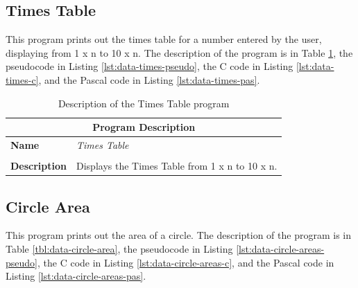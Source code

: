 \subsection{Times Table} %
\label{sub:times_table}

This program prints out the times table for a number entered by the user, displaying from 1 x n to 10 x n. The description of the program is in Table \ref{tbl:data-times-table}, the pseudocode in Listing \ref{lst:data-times-pseudo}, the C code in Listing \ref{lst:data-times-c}, and the Pascal code in Listing \ref{lst:data-times-pas}.

\begin{table}[h]
\centering
\begin{tabular}{l|p{10cm}}
  \hline
  \multicolumn{2}{c}{\textbf{Program Description}} \\
  \hline
  \textbf{Name} & \emph{Times Table} \\
  \\
  \textbf{Description} & Displays the Times Table from 1 x n to 10 x n. \\
  \hline
\end{tabular}
\caption{Description of the Times Table program}
\label{tbl:data-times-table}
\end{table}



\clearpage




\clearpage
\subsection{Circle Area} %
\label{sub:circle_area_data}

This program prints out the area of a circle. The description of the program is in Table \ref{tbl:data-circle-area}, the pseudocode in Listing \ref{lst:data-circle-areas-pseudo}, the C code in Listing \ref{lst:data-circle-areas-c}, and the Pascal code in Listing \ref{lst:data-circle-areas-pas}.

